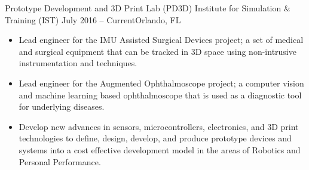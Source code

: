 \documentclass[10pt,a4paper]{altacv}
\begin{document}
\justify
{}
\tagline{ }

\begin{fullwidth}
\makecvheader
\end{fullwidth}





\nocite{*}

\printbibliography[heading=pubtype,title={\printinfo{\faFileTextO}{Conference Proceedings}}, type=inproceedings]



{Prototype Development and 3D Print Lab (PD3D)  \newline
Institute for Simulation \& Training (IST)}
{July 2016 -- Current}{Orlando, FL}

\begin{itemize}
    \item Lead engineer for the IMU Assisted Surgical Devices project; a set of medical and surgical equipment that can be tracked in 3D space using non-intrusive instrumentation and techniques.

    \item Lead engineer for the Augmented Ophthalmoscope project; a computer vision and machine learning based ophthalmoscope that is used as a diagnostic tool for underlying diseases.

    \item Develop new advances in sensors, microcontrollers, electronics, and 3D print technologies to define, design, develop, and produce prototype devices and systems into a cost effective development model in the areas of Robotics and Personal Performance.
\end{itemize}
\end{document}
